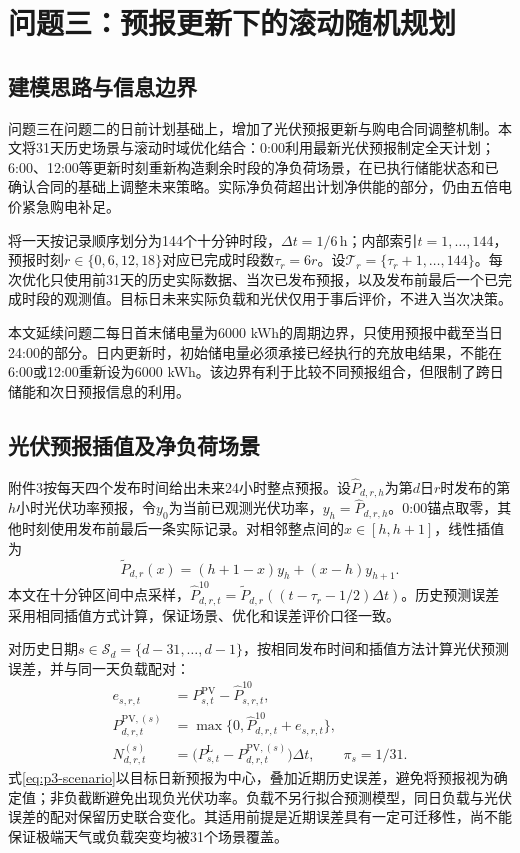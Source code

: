 \section{问题三：预报更新下的滚动随机规划}
\subsection{建模思路与信息边界}
问题三在问题二的日前计划基础上，增加了光伏预报更新与购电合同调整机制。本文将31天历史场景与滚动时域优化结合：0:00利用最新光伏预报制定全天计划；6:00、12:00等更新时刻重新构造剩余时段的净负荷场景，在已执行储能状态和已确认合同的基础上调整未来策略。实际净负荷超出计划净供能的部分，仍由五倍电价紧急购电补足。

将一天按记录顺序划分为144个十分钟时段，$\Delta t=1/6\,\mathrm h$；内部索引$t=1,\ldots,144$，预报时刻$r\in\{0,6,12,18\}$对应已完成时段数$\tau_r=6r$。设$\mathcal T_r=\{\tau_r+1,\ldots,144\}$。每次优化只使用前31天的历史实际数据、当次已发布预报，以及发布前最后一个已完成时段的观测值。目标日未来实际负载和光伏仅用于事后评价，不进入当次决策。

本文延续问题二每日首末储电量为6000 kWh的周期边界，只使用预报中截至当日24:00的部分。日内更新时，初始储电量必须承接已经执行的充放电结果，不能在6:00或12:00重新设为6000 kWh。该边界有利于比较不同预报组合，但限制了跨日储能和次日预报信息的利用。

\subsection{光伏预报插值及净负荷场景}
附件3按每天四个发布时间给出未来24小时整点预报。设$\widehat P_{d,r,h}$为第$d$日$r$时发布的第$h$小时光伏功率预报，令$y_0$为当前已观测光伏功率，$y_h=\widehat P_{d,r,h}$。0:00锚点取零，其他时刻使用发布前最后一条实际记录。对相邻整点间的$x\in[h,h+1]$，线性插值为
\begin{equation}
\widetilde P_{d,r}(x)=(h+1-x)y_h+(x-h)y_{h+1}.
\end{equation}
本文在十分钟区间中点采样，$\widehat P^{10}_{d,r,t}=\widetilde P_{d,r}((t-\tau_r-1/2)\Delta t)$。历史预测误差采用相同插值方式计算，保证场景、优化和误差评价口径一致。

对历史日期$s\in\mathcal S_d=\{d-31,\ldots,d-1\}$，按相同发布时间和插值方法计算光伏预测误差，并与同一天负载配对：
\begin{align}
e_{s,r,t}&=P^{\mathrm{PV}}_{s,t}-\widehat P^{10}_{s,r,t},\\
P^{\mathrm{PV},(s)}_{d,r,t}&=\max\{0,\widehat P^{10}_{d,r,t}+e_{s,r,t}\},\\
N^{(s)}_{d,r,t}&=\bigl(P^{\mathrm L}_{s,t}-P^{\mathrm{PV},(s)}_{d,r,t}\bigr)\Delta t,
\qquad \pi_s=1/31.\label{eq:p3-scenario}
\end{align}
式\eqref{eq:p3-scenario}以目标日新预报为中心，叠加近期历史误差，避免将预报视为确定值；非负截断避免出现负光伏功率。负载不另行拟合预测模型，同日负载与光伏误差的配对保留历史联合变化。其适用前提是近期误差具有一定可迁移性，尚不能保证极端天气或负载突变均被31个场景覆盖。

